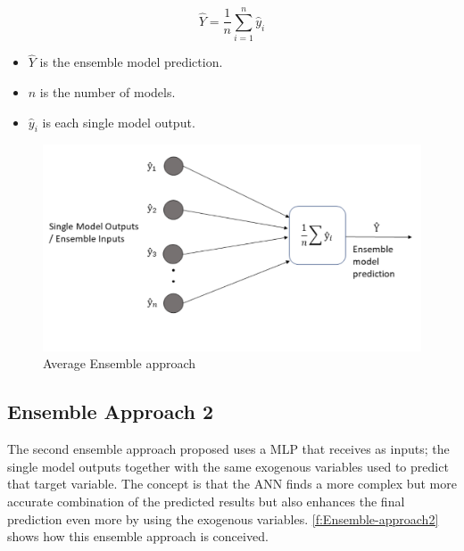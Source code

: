 \begin{equation}\label{eq:avg-ensemble}
    \hat{Y} = \frac{1}{n} \sum_{i=1}^{n}  \hat{y}_i
\end{equation}

\begin{itemize}
    \item \begin{math}\hat{Y}\end{math} is the ensemble model prediction.
    \item \begin{math}n\end{math} is the number of models.
    \item \begin{math}\hat{y}_i\end{math} is each single model output.
\end{itemize}

\begin{figure}[h]
\centering
\includegraphics[width=\linewidth]{figures/Ch4/Ensemble_Approach1.pdf}
\caption{Average Ensemble approach}
\label{f:Ensemble-approach1}
\end{figure}

\subsection{Ensemble Approach 2}
\label{s:Ensemble-Approach2}
The second ensemble approach proposed uses a \ac{MLP} that receives as inputs; the single model outputs together with the same exogenous variables used to predict that target variable. The concept is that the \ac{ANN} finds a more complex but more accurate combination of the predicted results but also enhances the final prediction even more by using the exogenous variables. \autoref{f:Ensemble-approach2} shows how this ensemble approach is conceived. 

